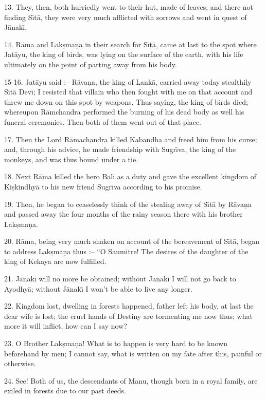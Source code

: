 13. They, then, both hurriedly went to their hut, made of leaves; and there not finding S\={\i}t\=a, they were very much afflicted with sorrows and went in quest of J\=anak\={\i}.

14. R\=ama and Lak\d{s}ma\d{n}a in their search for S\={\i}t\=a, came at last to the spot where Jat\=ayu, the king of birds, was lying on the surface of the earth, with his life ultimately on the point of parting away from his body.

15-16. Jat\=ayu said :-- R\=ava\d{n}a, the king of Lank\=a, carried away today stealthily S\={\i}t\=a Dev\={\i}; I resisted that villain who then fought with me on that account and threw me down on this spot by weapons. Thus saying, the king of birds died; whereupon R\=amchandra performed the burning of his dead body as well his funeral ceremonies. Then both of them went out of that place.

17. Then the Lord R\=amachandra killed Kabandha and freed him from his curse; and, through his advice, he made friendship with Sugr\={\i}va, the king of the monkeys, and was thus bound under a tie.

18. Next R\=ama killed the hero Bal\={\i} as a duty and gave the excellent kingdom of Ki\d{s}kindhy\=a to his new friend Sugr\={\i}va according to his promise.

19. Then, he began to ceaselessly think of the stealing away of S\={\i}t\=a by R\=ava\d{n}a and passed away the four months of the rainy season there with his brother Lak\d{s}ma\d{n}a.

20. R\=ama, being very much shaken on account of the bereavement of S\={\i}t\=a, began to address Lak\d{s}ma\d{n}a thus :-- ``O Saumitre! The desires of the daughter of the king of Kekaya are now fulfilled.

21. J\=anak\={\i} will no more be obtained; without J\=anak\={\i} I will not go back to Ayodhy\=a; without J\=anak\={\i} I won't be able to live any longer.

22. Kingdom lost, dwelling in forests happened, father left his body, at last the dear wife is lost; the cruel hands of Destiny are tormenting me now thus; what more it will inflict, how can I say now?

23. O Brother Lak\d{s}ma\d{n}a! What is to happen is very hard to be known beforehand by men; I cannot say, what is written on my fate after this, painful or otherwise.

24. See! Both of us, the descendants of Manu, though born in a royal family, are exiled in forests due to our past deeds.

